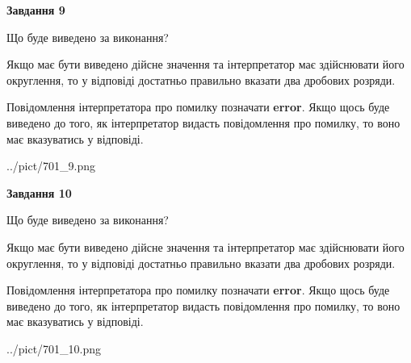 \documentclass[12pt, ukrainian]{article}
\begin{document}
{\begin {Large}
{\begin {center}\textbf{Завдання 9}\end {center}}\par
Що буде виведено за виконання? \par

Якщо має бути виведено дійсне значення та інтерпретатор має здійснювати його округлення, 
то у відповіді достатньо правильно вказати два дробових розряди.

Повідомлення інтерпретатора про помилку позначати \textbf{error}.
Якщо щось буде виведено до того, як інтерпретатор видасть повідомлення про помилку, 
то воно має вказуватись у відповіді. \par

\begin{center}
	{../pict/701_9.png}
\end{center}
\newpage

{\begin {center}\textbf{Завдання 10}\end {center}}\par
Що буде виведено за виконання? \par

Якщо має бути виведено дійсне значення та інтерпретатор має здійснювати його округлення, 
то у відповіді достатньо правильно вказати два дробових розряди.

Повідомлення інтерпретатора про помилку позначати \textbf{error}.
Якщо щось буде виведено до того, як інтерпретатор видасть повідомлення про помилку, 
то воно має вказуватись у відповіді. \par

\begin{center}
	{../pict/701_10.png}
\end{center}
\newpage

\end {Large}}
\end{document}
